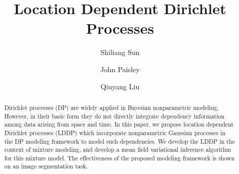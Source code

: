 \documentclass[runningheads,a4paper]{iscide}
\newcommand{\keywords}[1]{\par\addvspace\baselineskip
\noindent\keywordname\enspace\ignorespaces#1}
\begin{document}
\mainmatter  %

\title{Location Dependent Dirichlet Processes}

\titlerunning{}%
%
\author{Shiliang Sun
\and John Paisley \and Qiuyang Liu
}
%
%
%
\toctitle{}%
\tocauthor{}%
\maketitle


\begin{abstract}
Dirichlet processes (DP) are widely applied in Bayesian nonparametric modeling. However, in their basic form they do not directly integrate dependency information among data arising
from space and time. In this paper, we propose location dependent Dirichlet processes (LDDP) which incorporate nonparametric Gaussian
processes in the DP modeling framework to model such dependencies.  We develop the LDDP in the context of mixture modeling, and develop a mean field variational inference
algorithm for this mixture model. The effectiveness of the proposed
modeling framework is shown on an image segmentation task.
\end{abstract}
\end{document}
